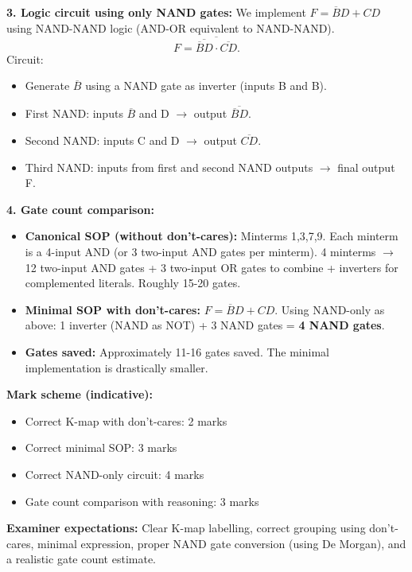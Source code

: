\documentclass[11pt]{article}
\begin{document}
\begin{corrige}
\textbf{3. Logic circuit using only NAND gates:}
We implement \(F = \overline{B}D + CD\) using NAND-NAND logic (AND-OR equivalent to NAND-NAND).
\[
F = \overline{\overline{\overline{B}D} \cdot \overline{CD}}.
\]
Circuit:
\begin{itemize}
\item Generate \(\overline{B}\) using a NAND gate as inverter (inputs B and B).
\item First NAND: inputs \(\overline{B}\) and D \(\rightarrow\) output \(\overline{\overline{B}D}\).
\item Second NAND: inputs C and D \(\rightarrow\) output \(\overline{CD}\).
\item Third NAND: inputs from first and second NAND outputs \(\rightarrow\) final output F.
\end{itemize}


\textbf{4. Gate count comparison:}
\begin{itemize}
\item \textbf{Canonical SOP (without don't-cares):} Minterms 1,3,7,9. Each minterm is a 4-input AND (or 3 two-input AND gates per minterm). 4 minterms \(\rightarrow\) 12 two-input AND gates + 3 two-input OR gates to combine + inverters for complemented literals. Roughly 15-20 gates.
\item \textbf{Minimal SOP with don't-cares:} \(F = \overline{B}D + CD\). Using NAND-only as above: 1 inverter (NAND as NOT) + 3 NAND gates = \textbf{4 NAND gates}.
\item \textbf{Gates saved:} Approximately 11-16 gates saved. The minimal implementation is drastically smaller.
\end{itemize}

\textbf{Mark scheme (indicative):}
\begin{itemize}
\item Correct K-map with don't-cares: 2 marks
\item Correct minimal SOP: 3 marks
\item Correct NAND-only circuit: 4 marks
\item Gate count comparison with reasoning: 3 marks
\end{itemize}
\textbf{Examiner expectations:} Clear K-map labelling, correct grouping using don't-cares, minimal expression, proper NAND gate conversion (using De Morgan), and a realistic gate count estimate.
\end{corrige}
\end{document}
